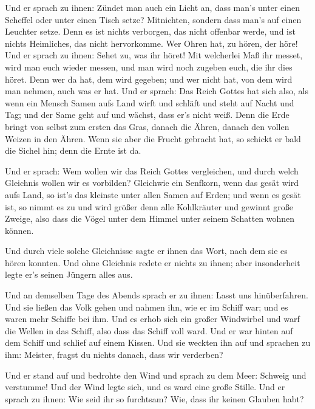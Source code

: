  Und er sprach zu ihnen: Zündet man auch ein Licht an,
dass man's unter einen Scheffel oder unter einen Tisch setze?
Mitnichten, sondern dass man's auf einen Leuchter setze. 
Denn es ist nichts verborgen, das nicht offenbar werde, und ist nichts
Heimliches, das nicht hervorkomme.  Wer Ohren hat, zu
hören, der höre!  Und er sprach zu ihnen: Sehet zu, was
ihr höret! Mit welcherlei Maß ihr messet, wird man euch wieder messen,
und man wird noch zugeben euch, die ihr dies höret.  Denn
wer da hat, dem wird gegeben; und wer nicht hat, von dem wird man
nehmen, auch was er hat.  Und er sprach: Das Reich Gottes
hat sich also, als wenn ein Mensch Samen aufs Land wirft 
und schläft und steht auf Nacht und Tag; und der Same geht auf und
wächst, dass er's nicht weiß.  Denn die Erde bringt von
selbst zum ersten das Gras, danach die Ähren, danach den vollen Weizen
in den Ähren.  Wenn sie aber die Frucht gebracht hat, so
schickt er bald die Sichel hin; denn die Ernte ist da.

 Und er sprach: Wem wollen wir das Reich Gottes
vergleichen, und durch welch Gleichnis wollen wir es vorbilden?
 Gleichwie ein Senfkorn, wenn das gesät wird aufs Land,
so ist's das kleinste unter allen Samen auf Erden;  und
wenn es gesät ist, so nimmt es zu und wird größer denn alle Kohlkräuter
und gewinnt große Zweige, also dass die Vögel unter dem Himmel unter
seinem Schatten wohnen können.

 Und durch viele solche Gleichnisse sagte er ihnen das
Wort, nach dem sie es hören konnten.  Und ohne Gleichnis
redete er nichts zu ihnen; aber insonderheit legte er's seinen Jüngern
alles aus.

 Und an demselben Tage des Abends sprach er zu ihnen:
Lasst uns hinüberfahren.  Und sie ließen das Volk gehen
und nahmen ihn, wie er im Schiff war; und es waren mehr Schiffe bei ihm.
 Und es erhob sich ein großer Windwirbel und warf die
Wellen in das Schiff, also dass das Schiff voll ward. 
Und er war hinten auf dem Schiff und schlief auf einem Kissen. Und sie
weckten ihn auf und sprachen zu ihm: Meister, fragst du nichts danach,
dass wir verderben?

 Und er stand auf und bedrohte den Wind und sprach zu dem
Meer: Schweig und verstumme! Und der Wind legte sich, und es ward eine
große Stille.  Und er sprach zu ihnen: Wie seid ihr so
furchtsam? Wie, dass ihr keinen Glauben habt?

